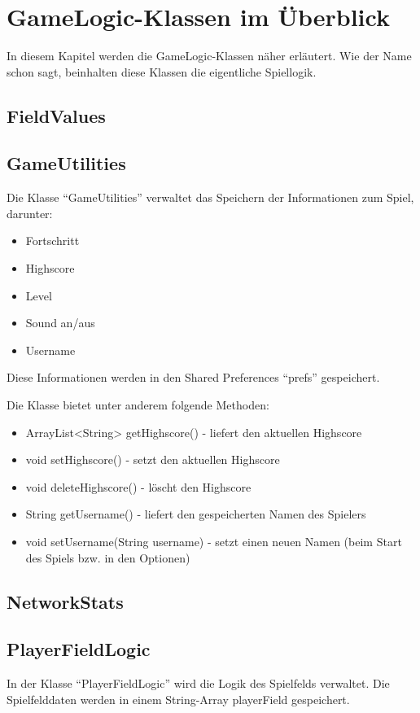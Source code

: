 \documentclass[11pt]{article} %
\begin{document}
\section{GameLogic-Klassen im Überblick}
In diesem Kapitel werden die GameLogic-Klassen näher erläutert. Wie der Name schon sagt, beinhalten diese Klassen die eigentliche Spiellogik.

\subsection{FieldValues}

\subsection{GameUtilities}
Die Klasse \enquote{GameUtilities} verwaltet das Speichern der Informationen zum Spiel, darunter:
\begin{itemize}
\item Fortschritt
\item Highscore
\item Level
\item Sound an/aus
\item Username
\end{itemize}

Diese Informationen werden in den Shared Preferences \enquote{prefs} gespeichert. 

Die Klasse bietet unter anderem folgende Methoden:
\begin{itemize}
\item ArrayList<String> getHighscore() - liefert den aktuellen Highscore
\item void setHighscore() - setzt den aktuellen Highscore
\item void deleteHighscore() - löscht den Highscore

\item String getUsername() - liefert den gespeicherten Namen des Spielers
\item void setUsername(String username) - setzt einen neuen Namen (beim Start des Spiels bzw. in den Optionen)
\end{itemize}

\subsection{NetworkStats}

\subsection{PlayerFieldLogic}
In der Klasse \enquote{PlayerFieldLogic} wird die Logik des Spielfelds verwaltet. Die Spielfelddaten werden in einem String-Array playerField gespeichert.
\end{document}
